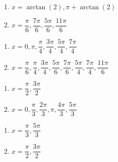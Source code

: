 \begin{multicols}{2}

\begin{enumerate}

\setcounter{enumi}{\value{HW}}

\item  $x=\arctan(2), \pi + \arctan(2)$ 
\item  $x = \dfrac{\pi}{6}, \dfrac{7\pi}{6}, \dfrac{5\pi}{6}, \dfrac{11\pi}{6}$

\setcounter{HW}{\value{enumi}}

\end{enumerate}

\end{multicols}

\begin{multicols}{2}

\begin{enumerate}

\setcounter{enumi}{\value{HW}}

\item  $x = 0, \pi, \dfrac{\pi}{4}, \dfrac{3\pi}{4}, \dfrac{5\pi}{4}, \dfrac{7\pi}{4}$
\item  $x = \dfrac{\pi}{6}, \dfrac{\pi}{4}, \dfrac{3\pi}{4}, \dfrac{5\pi}{6}, \dfrac{7\pi}{6}, \dfrac{5\pi}{4}, \dfrac{7\pi}{4}, \dfrac{11\pi}{6}$

\setcounter{HW}{\value{enumi}}

\end{enumerate}

\end{multicols}

\begin{multicols}{2}

\begin{enumerate}

\setcounter{enumi}{\value{HW}}

\item  $x = \dfrac{\pi}{2}, \dfrac{3\pi}{2}$
\item $x = 0, \dfrac{\pi}{3}, \dfrac{2\pi}{3}, \pi, \dfrac{4\pi}{3}, \dfrac{5\pi}{3}$

\setcounter{HW}{\value{enumi}}

\end{enumerate}

\end{multicols}

\begin{multicols}{2}

\begin{enumerate}

\setcounter{enumi}{\value{HW}}

\item $x = \dfrac{\pi}{3}, \dfrac{5\pi}{3}$
\item $x = \dfrac{\pi}{2}, \dfrac{3\pi}{2}$

\setcounter{HW}{\value{enumi}}

\end{enumerate}

\end{multicols}

